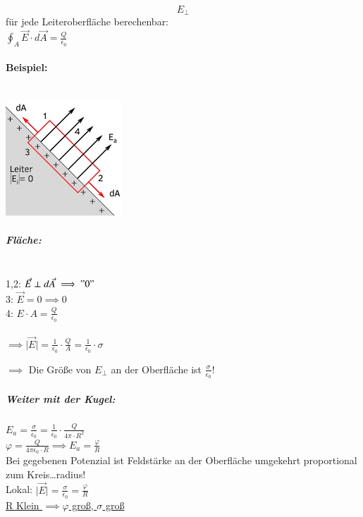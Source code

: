 \documentclass[11pt]{article}
\begin{document}
$$ E_\perp $$ für jede Leiteroberfläche berechenbar:\\

$ \displaystyle\oint_{A}\vec{E}\cdot d\vec{A} = \frac{Q}{\epsilon_0} $\\

\paragraph{Beispiel:}
\hfill\\
\includegraphics{skizzen/14/14_8B1}
\\
\subparagraph{Fläche:}
\hfill\\
1,2: $ \vec{E}\perp d\vec{A} \implies "0" $\\
3: $ \vec{E}=0 \implies 0 $\\
4: $ E\cdot A= \frac{Q}{\epsilon_0} $\\
\hfill\\

$ \implies \vert\vec{E}\vert = \frac{1}{\epsilon_0}\cdot \frac{Q}{A} = \frac{1}{\epsilon_0}\cdot\sigma $

$\implies$ Die Grö\ss{}e von $E_\perp$ an der Oberfläche ist $\frac{\sigma}{\epsilon_0}$!\\

\subparagraph{Weiter mit der Kugel:} $ E_a= \frac{\sigma}{\epsilon_0}=\frac{1}{\epsilon_0}\cdot\frac{Q}{4\pi\cdot R^2} $\\

$ \varphi = \frac{Q}{4\pi\epsilon_0\cdot R} \implies E_a=\frac{\varphi}{R}$\\

Bei gegebenen Potenzial ist Feldstärke an der Oberfläche umgekehrt proportional zum Kreis…radius!\\

Lokal: $ \vert\vec{E}\vert = \frac{\sigma}{\epsilon_0}=\frac{\varphi}{R} $\\

\underline{R Klein $\implies \varphi$ gro\ss{}, $\sigma$ gro\ss{}}\\
\end{document}

